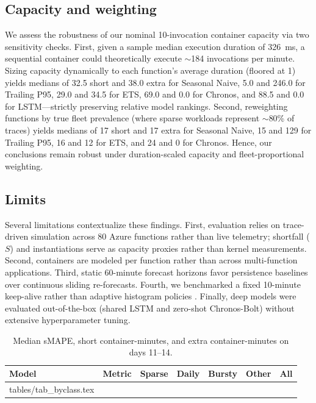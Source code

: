 \documentclass[conference,a4paper]{IEEEtran}
\makeatletter
\newcommand{\inputtable}[1]{\@@input #1 }
\makeatother
\begin{document}
\subsection{Capacity and weighting}
We assess the robustness of our nominal 10-invocation container capacity via two sensitivity checks. First, given a sample median execution duration of 326~ms, a sequential container could theoretically execute $\sim$184 invocations per minute. Sizing capacity dynamically to each function's average duration (floored at 1) yields medians of 32.5 short and 38.0 extra for Seasonal Naive, 5.0 and 246.0 for Trailing P95, 29.0 and 34.5 for ETS, 69.0 and 0.0 for Chronos, and 88.5 and 0.0 for LSTM---strictly preserving relative model rankings. Second, reweighting functions by true fleet prevalence (where sparse workloads represent $\sim$80\% of traces) yields medians of 17 short and 17 extra for Seasonal Naive, 15 and 129 for Trailing P95, 16 and 12 for ETS, and 24 and 0 for Chronos. Hence, our conclusions remain robust under duration-scaled capacity and fleet-proportional weighting.

\subsection{Limits}
Several limitations contextualize these findings. First, evaluation relies on trace-driven simulation across 80 Azure functions rather than live telemetry; shortfall ($S$) and instantiations serve as capacity proxies rather than kernel measurements. Second, containers are modeled per function rather than across multi-function applications. Third, static 60-minute forecast horizons favor persistence baselines over continuous sliding re-forecasts. Fourth, we benchmarked a fixed 10-minute keep-alive rather than adaptive histogram policies \cite{shahrad2020serverless}. Finally, deep models were evaluated out-of-the-box (shared LSTM and zero-shot Chronos-Bolt) without extensive hyperparameter tuning.

\begin{table}[t]
\caption{Median {\normalfont s}MAPE, short container-minutes, and extra container-minutes on days 11--14.}
\label{tab:byclass}
\centering
\scriptsize
\setlength{\tabcolsep}{2pt}
\begin{tabular}{|l|l|r|r|r|r|r|}
\hline
\textbf{Model} & \textbf{Metric} & \textbf{Sparse} & \textbf{Daily} & \textbf{Bursty} & \textbf{Other} & \textbf{All} \\
\hline
\inputtable{tables/tab_byclass.tex}
\end{tabular}
\end{table}
\end{document}

